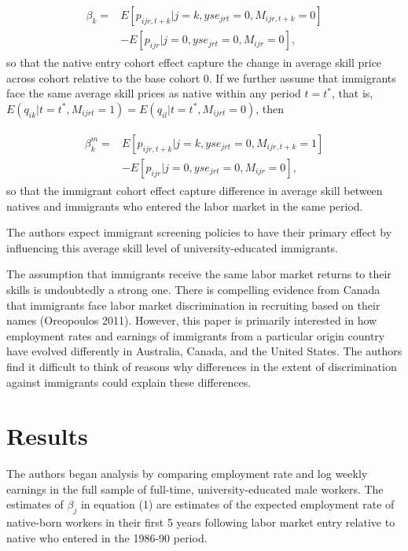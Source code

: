 \documentclass[../root]{subfiles}
\begin{document}
    \begin{align}
        \begin{split}
            \beta_k = &E[p_{ijr,t+k}|j=k, yse_{jrt}=0, M_{ijr, t+k}=0] \\
            &- E[p_{ijr}|j=0, yse_{jrt}=0, M_{ijr}=0],
        \end{split}
    \end{align}
     so that the native entry cohort effect capture the change in average skill price across cohort relative to the base cohort 0.
     If we further assume that immigrants face the same average skill prices as native within any period $t=t^*$, that is, $E(q_{ik}|t=t^*, M_{ijrt}=1)=E(q_{il}|t=t^*, M_{ijrt}=0)$, then 
     
     \begin{align}
        \begin{split}
            \beta^m_k = &E[p_{ijr,t+k}|j=k, yse_{jrt}=0, M_{ijr, t+k}=1] \\
            &- E[p_{ijr}|j=0, yse_{jrt}=0, M_{ijr}=0],
        \end{split}
    \end{align}
     so that the immigrant cohort effect capture difference in average skill between natives and immigrants who entered the labor market in the same period.
     
     The authors expect immigrant screening policies to have their primary effect by influencing this average skill level of university-educated immigrants. 
      
     
     The assumption that immigrants receive the same labor market returns to their skills is undoubtedly a strong one. There is compelling evidence from Canada that immigrants face labor market discrimination in recruiting based on their names (Oreopoulos 2011). However, this paper  is primarily interested in how employment rates and earnings of immigrants from a particular origin country have evolved differently in Australia, Canada, and the United States. The authors find it difficult to think of reasons why differences in the extent of discrimination against immigrants could explain these differences.
     
     \section{Results}
     
     The authors began analysis by comparing employment rate and log weekly earnings in the full sample of full-time, university-educated male workers. The estimates of $\beta_j$ in equation (1) are estimates of the expected employment rate of native-born workers in their first 5 years following labor market entry relative to native who entered in the 1986-90 period. 
     
\end{document}
